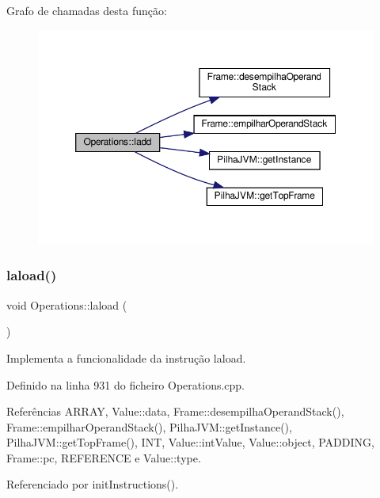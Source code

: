 Grafo de chamadas desta função\+:
\nopagebreak
\begin{figure}[H]
\begin{center}
\leavevmode
\includegraphics[width=350pt]{classOperations_ad4b153d687baa98c26fcfe7c24e12f45_cgraph}
\end{center}
\end{figure}
\mbox{\label{classOperations_a064f10825e8f0153ef19d466845d3734}} 
\subsubsection{\texorpdfstring{laload()}{laload()}}
{\footnotesize\ttfamily void Operations\+::laload (\begin{DoxyParamCaption}{ }\end{DoxyParamCaption})\hspace{0.3cm}{\ttfamily [private]}}



Implementa a funcionalidade da instrução laload. 



Definido na linha 931 do ficheiro Operations.\+cpp.



Referências A\+R\+R\+AY, Value\+::data, Frame\+::desempilha\+Operand\+Stack(), Frame\+::empilhar\+Operand\+Stack(), Pilha\+J\+V\+M\+::get\+Instance(), Pilha\+J\+V\+M\+::get\+Top\+Frame(), I\+NT, Value\+::int\+Value, Value\+::object, P\+A\+D\+D\+I\+NG, Frame\+::pc, R\+E\+F\+E\+R\+E\+N\+CE e Value\+::type.



Referenciado por init\+Instructions().

